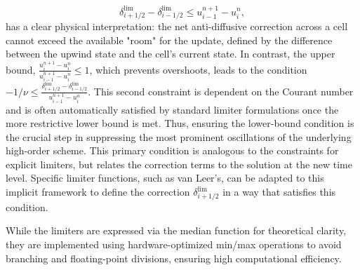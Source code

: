 \[
    \delta_{i+1/2}^{\text{lim}} - \delta_{i-1/2}^{\text{lim}} \le u_{i-1}^{n+1} - u_i^n,
\]
has a clear physical interpretation: the net anti-diffusive correction across a cell cannot exceed the available "room" for the update, defined by the difference between the upwind state and the cell's current state.
In contrast, the upper bound, \(\frac{u_{i}^{n+1}-u_{i}^{n}}{u_{i-1}^{n+1}-u_{i}^{n}} \le 1\), which prevents overshoots, leads to the condition \(-1/\nu \le \frac{\delta_{i+1/2}^{\text{lim}} - \delta_{i-1/2}^{\text{lim}}}{u_{i-1}^{n+1}-u_{i}^{n}}\).
This second constraint is dependent on the Courant number and is often automatically satisfied by standard limiter formulations once the more restrictive lower bound is met.
Thus, ensuring the lower-bound condition is the crucial step in suppressing the most prominent oscillations of the underlying high-order scheme.
This primary condition is analogous to the constraints for explicit limiters, but relates the correction terms to the solution at the new time level.
Specific limiter functions, such as van Leer's, can be adapted to this implicit framework to define the correction \(\delta_{i+1/2}^{\text{lim}}\) in a way that satisfies this condition.

While the limiters are expressed via the median function for theoretical clarity, they are implemented using hardware-optimized min/max operations to avoid branching and floating-point divisions, ensuring high computational efficiency.
